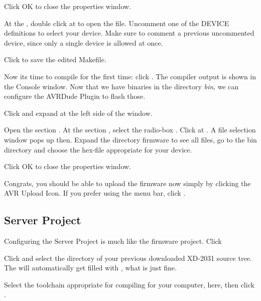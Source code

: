 Click OK to close the properties window.

At the , double click at  to open the file.
Uncomment one of the DEVICE definitions to select your device. Make sure to comment a previous
uncommented device, since only a single device is allowed at once.

Click  to save the edited Makefile.

Now its time to compile for the first time: click . The compiler output is shown in the Console window. Now that we have
binaries in the directory \textit{bin}, we can configure the 
AVRDude Plugin to flash those.

\clearpage

Click  and expand 
 at the left side of the 
 window.

Open the section . 
At the section , select the radio-box
. Click at
. A file selection window pops up then.
Expand the directory firmware to see all files, go to the bin
directory and choose the hex-file appropriate for your device.


Click OK to close the properties window.

Congrats, you should be able to upload the firmware now simply by clicking
the AVR Upload Icon. If you prefer using the menu bar, click
.

\subsection{Server Project}
Configuring the Server Project is much like the firmware project. 
Click 

Click  and select the directory  of your previous 
downloaded \mbox{XD-2031} source tree. The  will automatically get filled 
with , what is just fine.

Select the toolchain appropriate for compiling for your computer,  here, 
then click .

